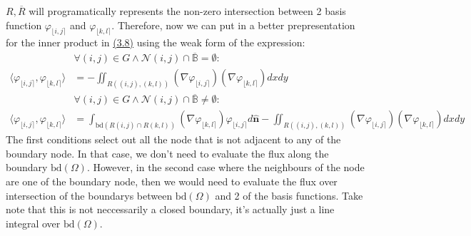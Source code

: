 \documentclass[]{article}
\begin{document}
    $R, \overline{R}$ will programatically represents the non-zero intersection between 2 basis function $\varphi_{\lfloor i,j \rceil}$ and $\varphi_{\lfloor k, l \rceil}$. Therefore, now we can put in a better prepresentation for the inner product in \hyperref[eqn:3.8]{(3.8)} using the weak form of the expression: 
    \begin{align*}\tag{3.10}\label{eqn:3.10}
        & \forall (i, j)\in G \wedge \mathcal{N}(i, j)\cap \overline{\mathbb{B}} = \emptyset: 
        \\
        \langle \varphi_{\lfloor i, j\rceil},\varphi_{\lfloor k, l\rceil}
        \rangle &=
        -\iint_{R((i, j), (k, l))} (\nabla \varphi_{\lfloor i,j \rceil})(\nabla \varphi_{\lfloor k, l\rceil})dxdy
        \\
        & \forall (i, j)\in G \wedge \mathcal{N}(i, j)\cap \overline{\mathbb{B}} \neq \emptyset: 
        \\
        \langle \varphi_{\lfloor i, j\rceil},\varphi_{\lfloor k, l\rceil}
        \rangle &=
        \int_{\text{bd}(R(i,j)\cap R(k, l))}
        (\nabla \varphi_{\lfloor k, l\rceil})\varphi_{\lfloor i, j\rceil}d
        \hat{\mathbf{n}}
        -\iint_{R((i, j), (k, l))} (\nabla \varphi_{\lfloor i,j \rceil})(\nabla \varphi_{\lfloor k, l\rceil})dxdy
    \end{align*}
    The first conditions select out all the node that is not adjacent to any of the boundary node. In that case, we don't need to evaluate the flux along the boundary $\text{bd}(\Omega)$. However, in the second case where the neighbours of the node are one of the boundary node, then we would need to evaluate the flux over intersection of the boundarys between $\text{bd}(\Omega)$ and 2 of the basis functions. Take note that this is not neccessarily a closed boundary, it's actually just a line integral over $\text{bd}(\Omega)$. 
        
\end{document}
